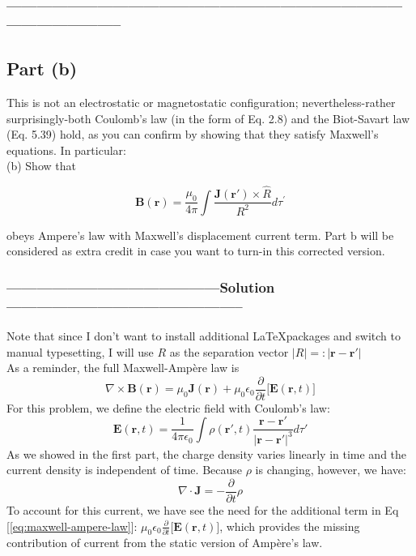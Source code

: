 \documentclass[a4paper,12pt]{article} %
\begin{document}
\subsubsection*{-----------------------------------------------------------------------------------------------------}
\subsection*{Part (b)}
This is not an electrostatic or magnetostatic configuration; nevertheless-rather surprisingly-both Coulomb's law (in the form of Eq. 2.8) and the Biot-Savart law (Eq. 5.39) hold, as you can confirm by showing that they satisfy Maxwell's equations. In particular:\\

(b) Show that

$$
\mathbf{B}(\mathbf{r})=\frac{\mu_0}{4 \pi} \int \frac{\mathbf{J}\left(\mathbf{r}'\right) \times \hat{R}}{R^2} d \tau^{\prime}
$$

obeys Ampere's law with Maxwell's displacement current term.
Part b will be considered as extra credit in case you want to turn-in this corrected version.

\subsubsection*{------------------------------------------Solution-----------------------------------------------}
Note that since I don't want to install additional \LaTeX  packages and switch to manual typesetting, I will use $R$ as the separation vector $|R| =: |\mathbf{r} - \mathbf{r}'| $\\

As a reminder, the full Maxwell-Ampère law is
\begin{equation}
\nabla \times \mathbf{B}(\mathbf{r}) = \mu_0\mathbf{J}(\mathbf{r}) + \mu_0\epsilon_0 \frac{\partial}{\partial t} \Big[\mathbf{E}(\mathbf{r}, t)\Big]
	\label{eq:maxwell-ampere-law}
\end{equation}
For this problem, we define the electric field with Coulomb's law:
\begin{equation}
\mathbf{E}(\mathbf{r}, t) = \frac{1}{4\pi\epsilon_0} \int \rho(\mathbf{r}', t)\frac{\mathbf{r} - \mathbf{r}'}{|\mathbf{r} - \mathbf{r}'|^3}d\tau'
	\label{eq:coulomb-law}
\end{equation}
As we showed in the first part, the charge density varies linearly in time and the current density is independent of time. Because $\rho$ is changing, however, we have:
$$ \nabla \cdot \mathbf{J} = -\frac{\partial}{\partial t} \rho $$
To account for this current, we have see the need for the additional term in Eq [\ref{eq:maxwell-ampere-law}]: $\mu_0\epsilon_0\frac{\partial}{\partial t} \Big[\mathbf{E}(\mathbf{r}, t)\Big]$, which provides the missing contribution of current from the static version of Ampère's law.\\
\end{document}
